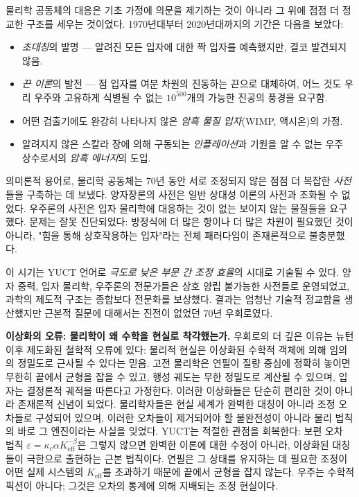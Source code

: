 \documentclass[12pt,a4paper]{article}
\begin{document}
	물리학 공동체의 대응은 기초 가정에 의문을 제기하는 것이 아니라 그 위에 점점 더 정교한 구조를 세우는 것이었다. 1970년대부터 2020년대까지의 기간은 다음을 보았다:
	\begin{itemize}
		\item \emph{초대칭}의 발명 — 알려진 모든 입자에 대한 짝 입자를 예측했지만, 결코 발견되지 않음.
		\item \emph{끈 이론}의 발전 — 점 입자를 여분 차원의 진동하는 끈으로 대체하여, 어느 것도 우리 우주와 고유하게 식별될 수 없는 \(10^{500}\)개의 가능한 진공의 풍경을 요구함.
		\item 어떤 검출기에도 완강히 나타나지 않은 \emph{암흑 물질 입자}(WIMP, 액시온)의 가정.
		\item 알려지지 않은 스칼라 장에 의해 구동되는 \emph{인플레이션}과 기원을 알 수 없는 우주 상수로서의 \emph{암흑 에너지}의 도입.
	\end{itemize}
	
	의미론적 용어로, 물리학 공동체는 70년 동안 서로 조정되지 않은 점점 더 복잡한 \emph{사전}들을 구축하는 데 보냈다. 양자장론의 사전은 일반 상대성 이론의 사전과 조화될 수 없었다. 우주론의 사전은 입자 물리학에 대응하는 것이 없는 보이지 않는 물질들을 요구했다. 문제는 잘못 진단되었다: 방정식에 더 많은 항이나 더 많은 차원이 필요했던 것이 아니라, "힘을 통해 상호작용하는 입자"라는 전체 패러다임이 존재론적으로 불충분했다.
	
	이 시기는 YUCT 언어로 \emph{극도로 낮은 부문 간 조정 효율}의 시대로 기술될 수 있다. 양자 중력, 입자 물리학, 우주론의 전문가들은 상호 양립 불가능한 사전들로 운영되었고, 과학의 제도적 구조는 종합보다 전문화를 보상했다. 결과는 엄청난 기술적 정교함을 생산했지만 근본적 질문에 대해서는 진전이 없었던 70년 우회로였다.
	
	\textbf{이상화의 오류: 물리학이 왜 수학을 현실로 착각했는가.} 우회로의 더 깊은 이유는 뉴턴 이후 제도화된 철학적 오류에 있다: 물리적 현실은 이상화된 수학적 객체에 의해 임의의 정밀도로 근사될 수 있다는 믿음. 고전 물리학은 연필이 질량 중심에 정확히 놓이면 무한히 끝에서 균형을 잡을 수 있고, 행성 궤도는 무한 정밀도로 계산될 수 있으며, 입자는 결정론적 궤적을 따른다고 가정한다. 이러한 이상화들은 단순히 편리한 것이 아니라 존재론적 신념이 되었다. 물리학자들은 현실 세계가 완벽한 대칭이 아니라 조정 오차들로 구성되어 있으며, 이러한 오차들이 제거되어야 할 불완전성이 아니라 물리 법칙의 바로 그 엔진이라는 사실을 잊었다. YUCT는 적절한 관점을 회복한다: 보편 오차 법칙 \(\varepsilon = \kappa_c \alpha K_{\mathrm{eff}}^{-\beta}\)은 그렇지 않으면 완벽한 이론에 대한 수정이 아니라, 이상화된 대칭들이 극한으로 출현하는 근본 법칙이다. 연필은 그 상태를 유지하는 데 필요한 조정이 어떤 실제 시스템의 \(K_{\mathrm{eff}}\)를 초과하기 때문에 끝에서 균형을 잡지 않는다. 우주는 수학적 픽션이 아니다; 그것은 오차의 통계에 의해 지배되는 조정 현실이다.
	
\end{document}
